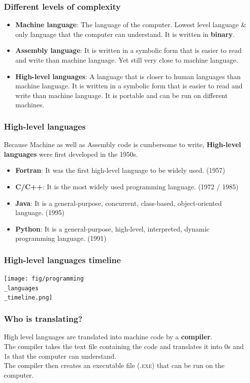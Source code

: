 \documentclass{beamer}
\begin{document}
\begin{frame}
  \frametitle{Different levels of complexity}
  \begin{itemize}
    \item \textbf{Machine language}: The language of the computer. Lowest level language \& only language that the computer can understand. It is written in \textbf{binary}.
    \item \textbf{Assembly language}: It is written in a symbolic form that is easier to read and write than machine language. Yet still very close to machine language. 
    \item \textbf{High-level languages}: A language that is closer to human languages than machine language. It is written in a symbolic form that is easier to read and write than machine language. It is portable and can be run on different machines.
  \end{itemize}
\end{frame}
\begin{frame}
  \frametitle{High-level languages}
  Because Machine as well as Assembly code is cumbersome to write, \textbf{High-level languages} were first developed in the 1950s.\\
  \begin{itemize}
    \item \textbf{Fortran}: It was the first high-level language to be widely used. (1957)
    \item \textbf{C/C++}: It is the most widely used programming language. (1972 / 1985)
    \item \textbf{Java}: It is a general-purpose, concurrent, class-based, object-oriented language. (1995)
    \item \textbf{Python}: It is a general-purpose, high-level, interpreted, dynamic programming language. (1991)
  \end{itemize}

\end{frame}
\begin{frame}
  \frametitle{High-level languages timeline}
  \begin{center}
    \texttt{[image: fig/programming\\\_languages\\\_timeline.png]}
  \end{center}
\end{frame}
\begin{frame}
  \frametitle{Who is translating?}
  High level languages are translated into machine code by a \textbf{compiler}.\\
  \vspace{0.5cm}
  The compiler takes the text file containing the code and translates it into 0s and 1s that the computer can understand.\\
  \vspace{0.5cm}
  The compiler then creates an executable file (\textsc{.exe}) that can be run on the computer.\\
\end{frame}
\end{document}

